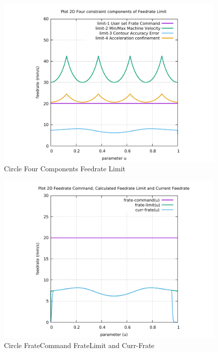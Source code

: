 \begin{figure}
	\caption     {Circle Four Components Feedrate Limit}
	\label{10-img-Circle-Four-Components-Feedrate-Limit.pdf}
	\includegraphics[width=1.00\textwidth]{Chap4/appendix/app-Circle/plots/10-img-Circle-Four-Components-Feedrate-Limit.pdf}
\end{figure}

\clearpage
\pagebreak

\begin{figure}
	\caption     {Circle FrateCommand FrateLimit and Curr-Frate}
	\label{11-img-Circle-FrateCommand-FrateLimit-and-Curr-Frate.pdf}
	\includegraphics[width=1.00\textwidth]{Chap4/appendix/app-Circle/plots/11-img-Circle-FrateCommand-FrateLimit-and-Curr-Frate.pdf}
\end{figure}


